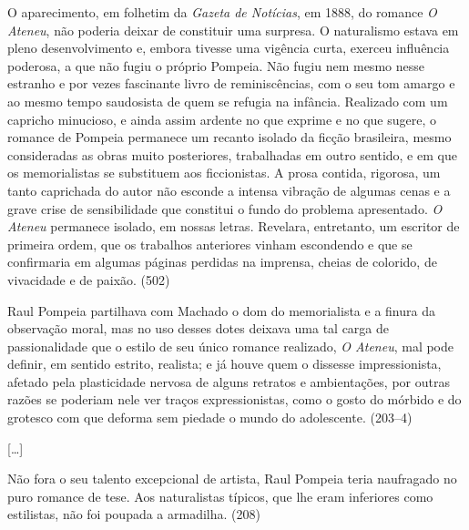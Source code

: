 

O aparecimento, em folhetim da \textit{Gazeta
de Notícias}, em 1888, do romance \textit{O
Ateneu}, não poderia deixar de constituir uma
surpresa. O naturalismo estava em pleno desenvolvimento e, embora
tivesse uma vigência curta, exerceu influência poderosa, a que não
fugiu o próprio Pompeia. Não fugiu nem mesmo nesse estranho e por vezes
fascinante livro de reminiscências, com o seu tom amargo e ao mesmo
tempo saudosista de quem se refugia na infância. Realizado com um
capricho minucioso, e ainda assim ardente no que exprime e no que
sugere, o romance de Pompeia permanece um recanto isolado da ficção
brasileira, mesmo consideradas as obras muito posteriores, trabalhadas
em outro sentido, e em que os memorialistas se substituem aos
ficcionistas. A prosa contida, rigorosa, um tanto caprichada do autor
não esconde a intensa vibração de algumas cenas e a grave crise de
sensibilidade que constitui o fundo do problema apresentado.
\textit{O Ateneu} permanece isolado, em
nossas letras. Revelara, entretanto, um escritor de primeira ordem, que
os trabalhos anteriores vinham escondendo e que se confirmaria em
algumas páginas perdidas na imprensa, cheias de colorido, de vivacidade
e de paixão. (502)



Raul Pompeia partilhava com Machado o dom do
memorialista e a finura da observação moral, mas no uso desses dotes
deixava uma tal carga de passionalidade que o estilo de seu único
romance realizado, \textit{O Ateneu}, mal
pode definir, em sentido estrito, realista; e já houve quem o dissesse
impressionista, afetado pela plasticidade nervosa de alguns retratos e
ambientações, por outras razões se poderiam nele ver traços
expressionistas, como o gosto do mórbido e do grotesco com que deforma
sem piedade o mundo do adolescente. (203--4)

[\ldots]

Não fora o seu talento excepcional de artista, Raul Pompeia teria
naufragado no puro romance de tese. Aos naturalistas típicos, que lhe
eram inferiores como estilistas, não foi poupada a armadilha. (208) 

